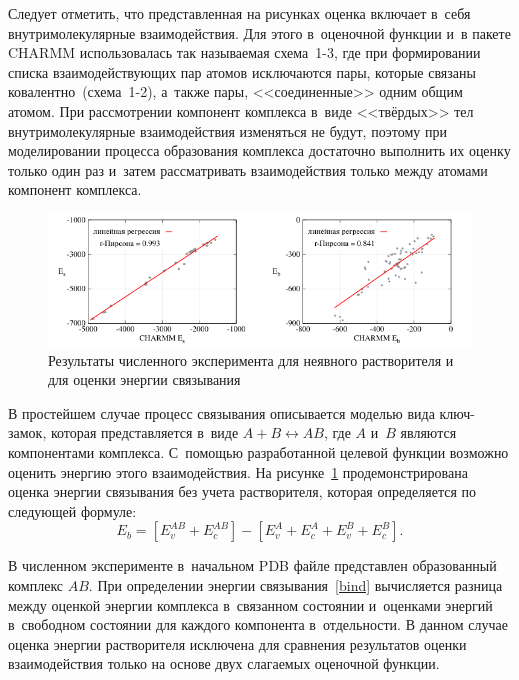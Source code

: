 Следует отметить, что представленная на рисунках оценка включает в~себя внутримолекулярные взаимодействия. Для этого в~оценочной функции и~в пакете CHARMM использовалась так называемая схема~1-3, где при формировании списка взаимодействующих пар атомов исключаются пары, которые связаны ковалентно~(схема~1-2), а~также пары, <<соединенные>> одним общим атомом. При рассмотрении компонент комплекса в~виде <<твёрдых>> тел внутримолекулярные взаимодействия изменяться не будут, поэтому при моделировании процесса образования комплекса достаточно выполнить их оценку только один раз и~затем рассматривать взаимодействия только между атомами компонент комплекса.

\begin{figure}[ht!]
	\centering
	\includegraphics[width=1.0\linewidth]{images/second.pdf}
	\caption{Результаты численного эксперимента для неявного растворителя и для оценки энергии связывания}
	\label{second}
\end{figure}

В простейшем случае процесс связывания описывается моделью вида ключ-замок, которая представляется в~виде $A+B\leftrightarrow AB$, где $A$ и~$B$ являются компонентами комплекса. С~помощью разработанной целевой функции возможно оценить энергию этого взаимодействия. На рисунке~\ref{second} продемонстрирована оценка энергии связывания без учета растворителя, которая определяется по следующей формуле:
\begin{equation}
	E_{b}=\left[E_{v}^{AB} + E_{c}^{AB}\right] - \left[E_{v}^{A} + E_{c}^{A} + E_{v}^{B} + E_{c}^{B}\right].
	\label{bind}
\end{equation}

В численном эксперименте в~начальном PDB файле представлен образованный комплекс $AB$. При определении энергии связывания~\eqref{bind} вычисляется разница между оценкой энергии комплекса в~связанном состоянии и~оценками энергий в~свободном состоянии для каждого компонента в~отдельности. В данном случае оценка энергии растворителя исключена для сравнения результатов оценки взаимодействия только на основе двух слагаемых оценочной функции.